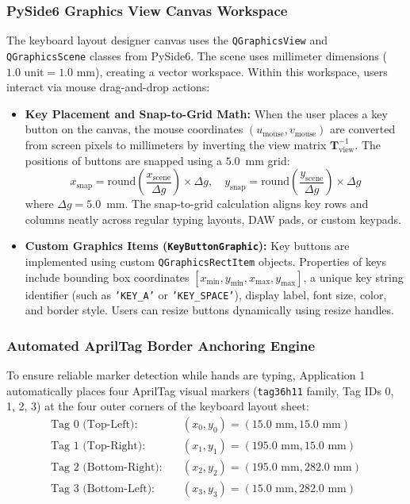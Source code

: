 \subsubsection{PySide6 Graphics View Canvas Workspace}
The keyboard layout designer canvas uses the \texttt{QGraphicsView} and \texttt{QGraphicsScene} classes from PySide6. The scene uses millimeter dimensions ($1.0\text{ unit} = 1.0\text{ mm}$), creating a vector workspace. Within this workspace, users interact via mouse drag-and-drop actions:
\begin{itemize}
    \item \textbf{Key Placement and Snap-to-Grid Math:} When the user places a key button on the canvas, the mouse coordinates $(u_{\text{mouse}}, v_{\text{mouse}})$ are converted from screen pixels to millimeters by inverting the view matrix $\mathbf{T}_{\text{view}}^{-1}$. The positions of buttons are snapped using a $5.0$~mm grid:
    \begin{equation}
    x_{\text{snap}} = \text{round}\left(\frac{x_{\text{scene}}}{\Delta g}\right) \times \Delta g, \quad
    y_{\text{snap}} = \text{round}\left(\frac{y_{\text{scene}}}{\Delta g}\right) \times \Delta g
    \label{eq:grid_snap_math}
    \end{equation}
    where $\Delta g = 5.0$~mm. The snap-to-grid calculation aligns key rows and columns neatly across regular typing layouts, DAW pads, or custom keypads.
    \item \textbf{Custom Graphics Items (\texttt{KeyButtonGraphic}):} Key buttons are implemented using custom \texttt{QGraphicsRectItem} objects. Properties of keys include bounding box coordinates $[x_{\min}, y_{\min}, x_{\max}, y_{\max}]$, a unique key string identifier (such as \texttt{'KEY\_A'} or \texttt{'KEY\_SPACE'}), display label, font size, color, and border style. Users can resize buttons dynamically using resize handles.
\end{itemize}

\subsubsection{Automated AprilTag Border Anchoring Engine}
To ensure reliable marker detection while hands are typing, Application 1 automatically places four AprilTag visual markers (\texttt{tag36h11} family, Tag IDs 0, 1, 2, 3) at the four outer corners of the keyboard layout sheet:
\begin{align}
\text{Tag 0 (Top-Left):} \quad & (x_0, y_0) = (15.0\text{ mm}, 15.0\text{ mm}) \label{eq:tag0_pos} \\
\text{Tag 1 (Top-Right):} \quad & (x_1, y_1) = (195.0\text{ mm}, 15.0\text{ mm}) \label{eq:tag1_pos} \\
\text{Tag 2 (Bottom-Right):} \quad & (x_2, y_2) = (195.0\text{ mm}, 282.0\text{ mm}) \label{eq:tag2_pos} \\
\text{Tag 3 (Bottom-Left):} \quad & (x_3, y_3) = (15.0\text{ mm}, 282.0\text{ mm}) \label{eq:tag3_pos}
\end{align}

